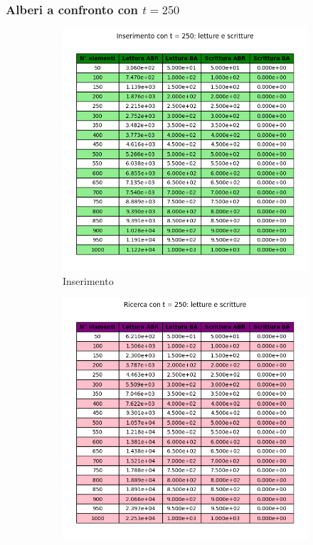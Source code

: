 \subsubsection{Alberi a confronto con $t = 250$}

\begin{figure}[H]
    \centering
    \begin{subfigure}[b]{0.49\textwidth}
        \centering
        \includegraphics[width=\textwidth]{tables/insert-wr-t250.png}
        \caption{Inserimento}
        \label{fig:tableinserttimet250}
    \end{subfigure}
    \hfill
    \begin{subfigure}[b]{0.49\textwidth}
        \centering
        \includegraphics[width=\textwidth]{tables/search-wr-t250.png}

\end{subfigure}
\end{figure}
